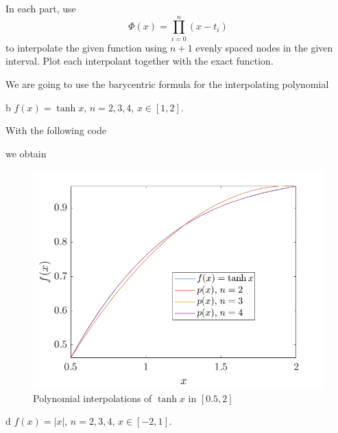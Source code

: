 \begin{statement}{3}
  In each part, use
  \[
    \Phi(x) = \prod_{i = 0}^n (x - t_i)
  \]
  to interpolate the given function using $n + 1$ evenly spaced
  nodes in the given interval. Plot each interpolant together with the exact function.
\end{statement}

\begin{solution}
  We are going to use the barycentric formula for the interpolating polynomial
  
\end{solution}

\begin{statement}{b}
  $f(x) = \tanh x$, $n = 2, 3, 4$, $x \in [1, 2]$.
\end{statement}

\begin{solution}
  With the following code
  
  we obtain
  \begin{figure}[H]
    \centering
    \includegraphics[scale=0.5]{graphics/plot-03-02.png}
    \caption{Polynomial interpolations of $\tanh x$ in $[0.5, 2]$}
  \end{figure}
\end{solution}

\begin{statement}{d}
  $f(x) = |x|$, $n = 2, 3, 4$, $x \in [-2, 1]$.
\end{statement}

